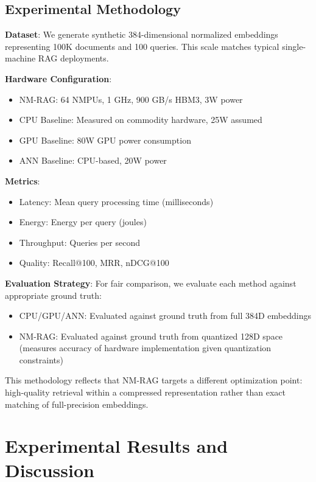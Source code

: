 \documentclass[conference]{IEEEtran}
\begin{document}
\subsection{Experimental Methodology}

\textbf{Dataset}: We generate synthetic 384-dimensional normalized embeddings representing 100K documents and 100 queries. This scale matches typical single-machine RAG deployments.

\textbf{Hardware Configuration}:
\begin{itemize}
    \item NM-RAG: 64 NMPUs, 1 GHz, 900 GB/s HBM3, 3W power
    \item CPU Baseline: Measured on commodity hardware, 25W assumed
    \item GPU Baseline: 80W GPU power consumption
    \item ANN Baseline: CPU-based, 20W power
\end{itemize}

\textbf{Metrics}:
\begin{itemize}
    \item Latency: Mean query processing time (milliseconds)
    \item Energy: Energy per query (joules)
    \item Throughput: Queries per second
    \item Quality: Recall@100, MRR, nDCG@100
\end{itemize}

\textbf{Evaluation Strategy}: For fair comparison, we evaluate each method against appropriate ground truth:
\begin{itemize}
    \item CPU/GPU/ANN: Evaluated against ground truth from full 384D embeddings
    \item NM-RAG: Evaluated against ground truth from quantized 128D space (measures accuracy of hardware implementation given quantization constraints)
\end{itemize}

This methodology reflects that NM-RAG targets a different optimization point: high-quality retrieval within a compressed representation rather than exact matching of full-precision embeddings.

\section{Experimental Results and Discussion}
\end{document}
